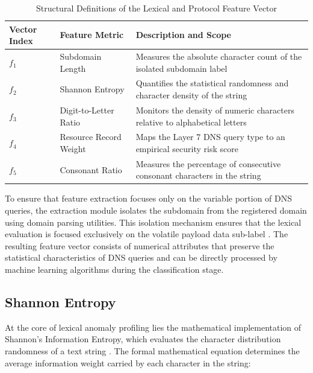 \documentclass[14pt, a4paper, oneside]{report}
\begin{document}
\begin{table}[H]
\centering
\caption{Structural Definitions of the Lexical and Protocol Feature Vector}
\vspace{0.1cm}
\label{tab:feature_definitions}
\bgroup
\normalsize
\renewcommand{\arraystretch}{1.5} 
\begin{tabular}{|l|l|p{5cm}|}
\hline
\textbf{Vector Index} & \textbf{Feature Metric} & \textbf{Description and Scope} \\ \hline
$f_1$ & Subdomain Length & Measures the absolute character count of the isolated subdomain label \\ \hline
$f_2$ & Shannon Entropy & Quantifies the statistical randomness and character density of the string \\ \hline
$f_3$ & Digit-to-Letter Ratio & Monitors the density of numeric characters relative to alphabetical letters \\ \hline
$f_4$ & Resource Record Weight & Maps the Layer 7 DNS query type to an empirical security risk score \\ \hline
$f_5$ & Consonant Ratio & Measures the percentage of consecutive consonant characters in the string \\ \hline
\end{tabular}
\egroup
\end{table}

To ensure that feature extraction focuses only on the variable portion of DNS queries, the extraction module isolates the subdomain from the registered domain using domain parsing utilities. This isolation mechanism ensures that the lexical evaluation is focused exclusively on the volatile payload data sub-label \cite{altuncu2021}. The resulting feature vector consists of numerical attributes that preserve the statistical characteristics of DNS queries and can be directly processed by machine learning algorithms during the classification stage.

\subsection{Shannon Entropy}
At the core of lexical anomaly profiling lies the mathematical implementation of Shannon's Information Entropy, which evaluates the character distribution randomness of a text string \cite{shannon1948}. The formal mathematical equation determines the average information weight carried by each character in the string:
\end{document}
